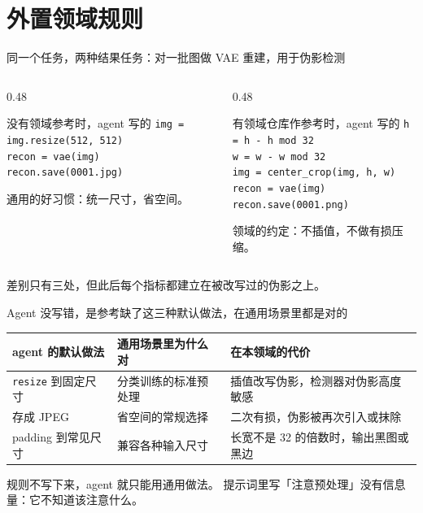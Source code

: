 \documentclass[aspectratio=169]{beamer}
\begin{document}
\section[外置规则]{外置领域规则}

\begin{frame}{同一个任务，两种结果}{任务：对一批图做 VAE 重建，用于伪影检测}
  \begin{columns}[T]
    \begin{column}{0.48\textwidth}
      \begin{alertblock}{没有领域参考时，agent 写的}
        \footnotesize
        \texttt{img = img.resize(512, 512)}\\
        \texttt{recon = vae(img)}\\
        \texttt{recon.save(0001.jpg)}
      \end{alertblock}
      \textcolor{soft}{\small 通用的好习惯：统一尺寸，省空间。}
    \end{column}
    \begin{column}{0.48\textwidth}
      \begin{exampleblock}{有领域仓库作参考时，agent 写的}
        \footnotesize
        \texttt{h = h - h mod 32}\\
        \texttt{w = w - w mod 32}\\
        \texttt{img = center\_crop(img, h, w)}\\
        \texttt{recon = vae(img)}\\
        \texttt{recon.save(0001.png)}
      \end{exampleblock}
      \textcolor{soft}{\small 领域的约定：不插值，不做有损压缩。}
    \end{column}
  \end{columns}
  \bigskip
  \begin{center}
  差别只有三处，但此后每个指标都建立在被改写过的伪影之上。
  \end{center}
\end{frame}

\begin{frame}{Agent 没写错，是参考缺了}{这三种默认做法，在通用场景里都是对的}
  \begin{center}
  \footnotesize
  \begin{tabular}{lll}
    \toprule
    \textbf{agent 的默认做法} & \textbf{通用场景里为什么对} & \textbf{在本领域的代价} \\
    \midrule
    \texttt{resize} 到固定尺寸 & 分类训练的标准预处理 & 插值改写伪影，检测器对伪影高度敏感 \\
    存成 JPEG & 省空间的常规选择 & 二次有损，伪影被再次引入或抹除 \\
    padding 到常见尺寸 & 兼容各种输入尺寸 & 长宽不是 32 的倍数时，输出黑图或黑边 \\
    \bottomrule
  \end{tabular}
  \end{center}
  \bigskip
  规则不写下来，agent 就只能用通用做法。
  提示词里写「注意预处理」没有信息量：它不知道该注意什么。
\end{frame}
\end{document}
